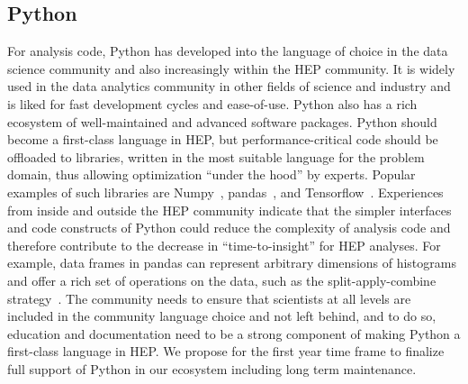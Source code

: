 \documentclass[12pt,a4paper]{article}
\begin{document}
\subsection{Python}
For analysis code, Python has developed into the language of choice in the data science community and also increasingly within the HEP community. It is widely used in the data analytics community in other fields of science and industry and is liked for fast development cycles and ease-of-use. Python also has a rich ecosystem of well-maintained and advanced software packages. Python should become a first-class language in HEP, but performance-critical code should be offloaded to libraries, written in the most suitable language for the problem domain, thus allowing optimization ``under the hood'' by experts. Popular examples of such libraries are Numpy~\cite{5725236-numpy}, pandas~\cite{mckinney-proc-scipy-2010}, and Tensorflow~\cite{abadi2016tensorflow}.  Experiences from inside and outside the HEP community indicate that the simpler interfaces and code constructs of Python could reduce the complexity of analysis code and therefore contribute to the decrease in ``time-to-insight'' for HEP analyses. For example, data frames in pandas can represent arbitrary dimensions of histograms and offer a rich set of operations on the data, such as the split-apply-combine strategy~\cite{JSSv040i01}. The community needs to ensure that scientists at all levels are included in the community language choice and not left behind, and to do so, education and documentation need to be a strong component of making Python a first-class language in HEP. We propose for the first year time frame to finalize full support of Python in our ecosystem including long term maintenance.
\end{document}
